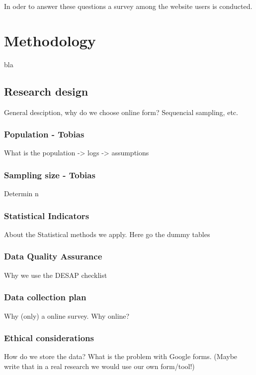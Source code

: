 \documentclass[12pt,a4paper,paper=a4,oneside,titlepage,pdftex]{scrartcl}
\begin{document}
In oder to answer these questions a survey among the website users is conducted.

\section{Methodology}
bla

\subsection{Research design}
General desciption, why do we choose online form? Sequencial sampling, etc.

\subsubsection{Population - Tobias}
What is the population -> logs -> assumptions

\subsubsection{Sampling size - Tobias}
Determin n

\subsubsection{Statistical Indicators}
About the Statistical methods we apply. Here go the dummy tables

\subsubsection{Data Quality Assurance}
Why we use the DESAP checklist

\subsubsection{Data collection plan}
Why (only) a online survey. Why online?


\subsubsection{Ethical considerations}
How do we store the data? What is the problem with Google forms. (Maybe write that in a real research we would use our own form/tool!)
\end{document}
